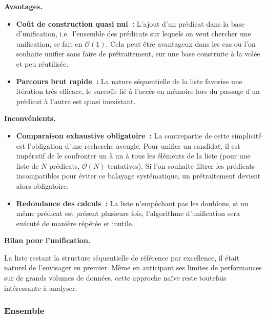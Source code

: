 \documentclass[11pt]{article}
\newenvironment{paraph}[1]{%
  \medskip
  \noindent\textbf{#1.}\quad

  \vspace{0.2cm}
}{%
  \medskip
}
\begin{document}
\begin{paraph}{Avantages}
    \begin{itemize}
        \item \textbf{Coût de construction quasi nul~:} L'ajout d'un 
        prédicat dans la base d'unification, i.e.~l'ensemble des prédicats
        sur lequels on veut chercher une unification, se fait en $\mathcal{O}(1)$. 
        Cela peut être avantageux dans les cas ou l'on souhaite 
        unifier sans faire de prétraitement, sur une base construite 
        à la volée et peu réutilisée.
        \item \textbf{Parcours brut rapide~:} La nature séquentielle 
        de la liste favorise une itération très efficace, le surcoût 
        lié à l'accès en mémoire lors du passage d'un prédicat à l'autre 
        est quasi inexistant.
    \end{itemize}
\end{paraph}

\begin{paraph}{Inconvénients}
    \begin{itemize}
    \item \textbf{Comparaison exhaustive obligatoire~:} La contrepartie 
    de cette simplicité est l'obligation d'une recherche aveugle. 
    Pour unifier un candidat, il est impératif de le confronter 
    un à un à tous les éléments de la liste 
    (pour une liste de $N$ prédicats, $\mathcal{O}(N)$  tentatives). 
    Si l'on souhaite filtrer les prédicats incompatibles pour éviter 
    ce balayage systématique, un prétraitement devient alors obligatoire.
    \item \textbf{Redondance des calculs~:} La liste n'empêchant pas 
    les doublons, si un même prédicat est présent plusieurs fois, 
    l'algorithme d'unification sera exécuté de manière répétée et inutile.
\end{itemize}
\end{paraph}

\begin{paraph}{Bilan pour l'unification}
    La liste restant la structure séquentielle de référence par 
    excellence, il était naturel de l’envisager en premier. 
    Même en anticipant ses limites de performances sur de grands 
    volumes de données, cette approche naïve reste toutefois intéressante à analyser.
\end{paraph}

\subsubsection{Ensemble}
\end{document}
